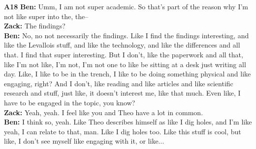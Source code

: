 \documentclass{article}
\begin{document}
\noindent\textbf{A18}\label{sec-A18}\newline
\textbf{Ben:} Umm, I am not super academic. So that's part of the reason
why I'm not like super into the, the--\\
\textbf{Zack:} The findings?\\
\textbf{Ben:} No, no not necessarily the findings. Like I find the
findings interesting, and like the Levallois stuff, and like the
technology, and like the differences and all that. I find that super
interesting. But I don't, like the paperwork and all that, like I'm not
like, I'm not, I'm not one to like be sitting at a desk just writing all
day. Like, I like to be in the trench, I like to be doing something
physical and like engaging, right? And I don't, like reading and like
articles and like scientific research and stuff, just like, it doesn't
interest me, like that much. Even like, I have to be engaged in the
topic, you know?\\
\textbf{Zack:} Yeah, yeah. I feel like you and Theo have a lot in
common.\\
\textbf{Ben:} I think so, yeah. Like Theo describes himself as like I
dig holes, and I'm like yeah, I can relate to that, man. Like I dig
holes too. Like this stuff is cool, but like, I don't see myself like
engaging with it, or like...\newline
\end{document}
